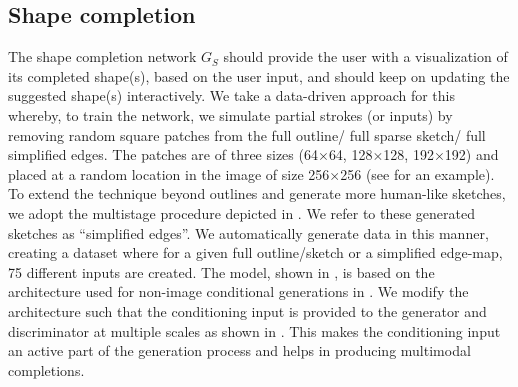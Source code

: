 \subsection{Shape completion}
\label{sec:shape}
The shape completion network $G_S$ should provide the user with a visualization of its completed shape(s), based on the user input, and should keep on updating the suggested shape(s) interactively. 
We take a data-driven approach for this whereby, to train the network, we simulate partial strokes (or inputs) by removing random square patches from the full outline/ full sparse sketch/ full simplified edges. 
The patches are of three sizes (64$\times$64, 128$\times$128, 192$\times$192) and placed at a random location in the image of size 256$\times$256 (see  for an example). To extend the technique beyond outlines and generate more human-like sketches, we adopt the multistage procedure depicted in . We refer to these generated sketches as ``simplified edges''.
We automatically generate data in this manner, creating a dataset where for a given full outline/sketch or a simplified edge-map, 75 different inputs are created.
The model, shown in , is based on the architecture used for non-image conditional generations in \cite{mescheder2018training}. We modify the architecture such that the conditioning input is provided to the generator and discriminator at multiple scales as shown in . This makes the conditioning input an active part of the generation process and helps in producing multimodal completions.



